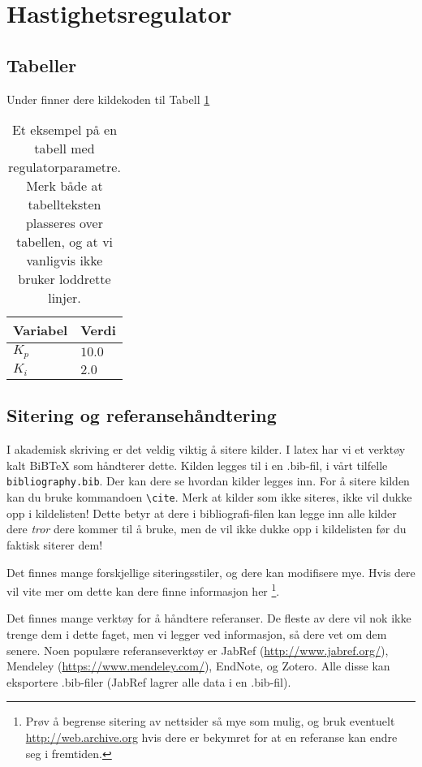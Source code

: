\section{Hastighetsregulator}\label{sec:hastighetsreg}
\subsection{Tabeller}
Under finner dere kildekoden til Tabell \ref{tab:eksempeltabell}


\begin{table}[tb]
	\centering
	\caption{Et eksempel på en tabell med regulatorparametre. Merk både at tabellteksten plasseres over tabellen, og at vi vanligvis ikke bruker loddrette linjer.}
	\begin{tabular}{ll} 
		\toprule
		Variabel & Verdi \\
		\midrule
        $K_p$ & $10.0$ \\
        $K_i$ & $2.0$\\
		\bottomrule
	\end{tabular}
\label{tab:eksempeltabell}
\end{table}

\subsection{Sitering og referansehåndtering}
I akademisk skriving er det veldig viktig å sitere kilder. I latex har vi et verktøy kalt BiBTeX som 
håndterer dette. Kilden legges til i en .bib-fil, i vårt tilfelle \texttt{bibliography.bib}. Der kan dere
se hvordan kilder legges inn. For å sitere kilden kan du bruke kommandoen \texttt{\textbackslash{cite}}.
Merk at kilder som ikke siteres, ikke vil dukke opp i kildelisten! Dette betyr at dere i bibliografi-filen kan
legge inn alle kilder dere \emph{tror} dere kommer til å bruke, men de vil ikke dukke opp i kildelisten før du
faktisk siterer dem!

Det finnes mange forskjellige siteringsstiler, og dere kan modifisere mye. Hvis dere vil vite mer om dette
kan dere finne informasjon her \cite{BiberBibtexEtc,WikibookLatex}\footnote{Prøv å begrense sitering av 
nettsider så mye som mulig, og bruk eventuelt \url{http://web.archive.org} hvis dere er bekymret for at en 
referanse kan endre seg i fremtiden.}.

Det finnes mange verktøy for å håndtere referanser. 
De fleste av dere vil nok ikke trenge dem i dette faget, men vi legger ved informasjon, så dere vet om dem 
senere. Noen populære referanseverktøy er JabRef (\url{http://www.jabref.org/}), Mendeley (\url{https://www.mendeley.com/}), EndNote, og Zotero. Alle disse kan eksportere .bib-filer (JabRef lagrer alle
data i en .bib-fil).
